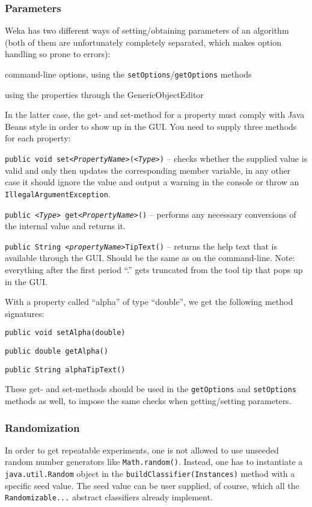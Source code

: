 \subsubsection*{Parameters}
Weka has two different ways of setting/obtaining parameters of an algorithm
(both of them are unfortunately completely separated, which makes option
handling so prone to errors):
\begin{tight_enumerate}
  \item command-line options, using the \texttt{setOptions}/\texttt{getOptions}
methods
  \item using the properties through the GenericObjectEditor
\end{tight_enumerate}
In the latter case, the get- and set-method for a property must comply with 
Java Beans style in order to show up in the GUI. You need to supply three
methods for each property:
\begin{tight_itemize}
  \item \texttt{public void set\textit{<PropertyName>}(\textit{<Type>})} --
checks whether the supplied value is valid and only then updates the
corresponding member variable, in any other case it should ignore the value
and output a warning in the console or throw an
\texttt{IllegalArgumentException}.
  \item \texttt{public \textit{<Type>} get\textit{<PropertyName>}()} --
performs any necessary conversions of the internal value and returns it.
  \item \texttt{public String \textit{<propertyName>}TipText()} -- returns the
help text that is available through the GUI. Should be the same as on the
command-line. Note: everything after the first period ``.'' gets truncated from
the tool tip that pops up in the GUI.
\end{tight_itemize}
With a property called ``alpha'' of type ``double'', we get the following
method signatures:
\begin{tight_itemize}
  \item \texttt{public void setAlpha(double)}
  \item \texttt{public double getAlpha()}
  \item \texttt{public String alphaTipText()}
\end{tight_itemize}
These get- and set-methods should be used in the \texttt{getOptions} and
\texttt{setOptions} methods as well, to impose the same checks when
getting/setting parameters.

\subsubsection*{Randomization}
In order to get repeatable experiments, one is not allowed to use unseeded
random number generators like \texttt{Math.random()}. Instead, one has to
instantiate a \texttt{java.util.Random} object in the
\texttt{buildClassifier(Instances)} method with a specific seed value. The seed
value can be user supplied, of course, which all the \texttt{Randomizable...}
abstract classifiers already implement.


